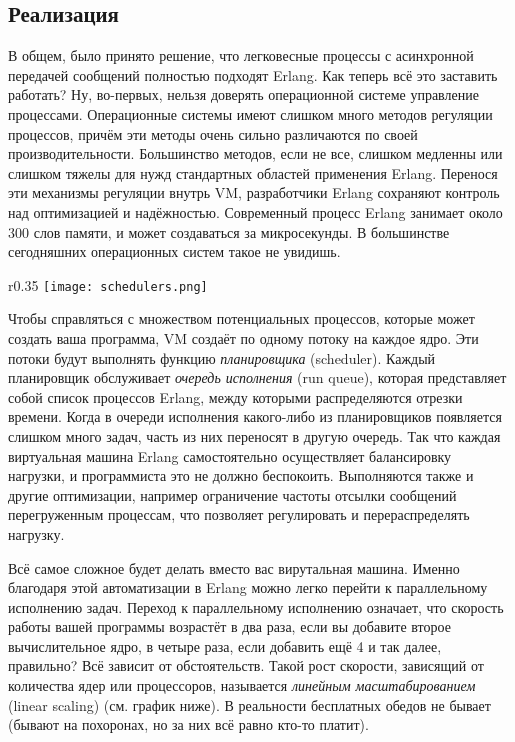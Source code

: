 \subsection{Реализация}
\label{implementation}
В общем, было принято решение, что легковесные процессы с асинхронной передачей сообщений полностью подходят Erlang.
Как теперь всё это заставить работать?
Ну, во\--первых, нельзя доверять операционной системе управление процессами.
Операционные системы имеют слишком много методов регуляции процессов, причём эти методы очень сильно различаются по своей производительности.
Большинство методов, если не все, слишком медленны или слишком тяжелы для нужд стандартных областей применения Erlang.
Перенося эти механизмы регуляции внутрь VM, разработчики Erlang сохраняют контроль над оптимизацией и надёжностью.
Современный процесс Erlang занимает около 300 слов памяти, и может создаваться за микросекунды.
В большинстве сегодняшних операционных систем такое не увидишь.

\begin{wrapfigure}{r}{0.35\linewidth}
    \texttt{[image: schedulers.png]}
\end{wrapfigure}
Чтобы справляться с множеством потенциальных процессов, которые может создать ваша программа, VM создаёт по одному потоку на каждое ядро.
Эти потоки будут выполнять функцию \emph{планировщика} (scheduler).
Каждый планировщик обслуживает \emph{очередь исполнения} (run queue), которая представляет собой список процессов Erlang, между которыми распределяются отрезки времени.
Когда в очереди исполнения какого\--либо из планировщиков появляется слишком много задач, часть из них переносят в другую очередь.
Так что каждая виртуальная машина Erlang самостоятельно осуществляет балансировку нагрузки, и программиста это не должно беспокоить.
Выполняются также и другие оптимизации, например ограничение частоты отсылки сообщений перегруженным процессам, что позволяет регулировать и перераспределять нагрузку.

Всё самое сложное будет делать вместо вас вирутальная машина.
Именно благодаря этой автоматизации в Erlang можно легко перейти к параллельному исполнению задач.
Переход к параллельному исполнению означает, что скорость работы вашей программы возрастёт в два раза, если вы добавите второе вычислительное ядро, в четыре раза, если добавить ещё 4 и так далее, правильно?
Всё зависит от обстоятельств.
Такой рост скорости, зависящий от количества ядер или процессоров, называется \emph{линейным масштабированием} (linear scaling) (см. график ниже).
В реальности бесплатных обедов не бывает (бывают на похоронах, но за них всё равно кто\--то платит).
